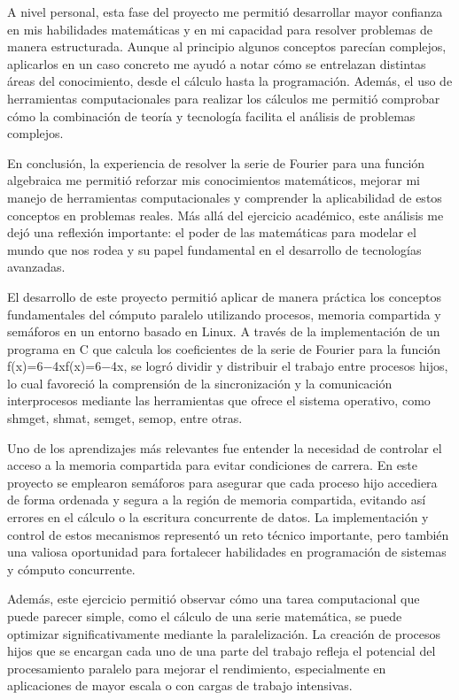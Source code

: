 {A nivel personal, esta fase del proyecto me permitió desarrollar mayor confianza en mis habilidades matemáticas y en mi capacidad para resolver problemas de manera estructurada. Aunque al principio algunos conceptos parecían complejos, aplicarlos en un caso concreto me ayudó a notar cómo se entrelazan distintas áreas del conocimiento, desde el cálculo hasta la programación. Además, el uso de herramientas computacionales para realizar los cálculos me permitió comprobar cómo la combinación de teoría y tecnología facilita el análisis de problemas complejos.

En conclusión, la experiencia de resolver la serie de Fourier para una función algebraica me permitió reforzar mis conocimientos matemáticos, mejorar mi manejo de herramientas computacionales y comprender la aplicabilidad de estos conceptos en problemas reales. Más allá del ejercicio académico, este análisis me dejó una reflexión importante: el poder de las matemáticas para modelar el mundo que nos rodea y su papel fundamental en el desarrollo de tecnologías avanzadas.

\newpage
El desarrollo de este proyecto permitió aplicar de manera práctica los conceptos fundamentales del cómputo paralelo utilizando procesos, memoria compartida y semáforos en un entorno basado en Linux. A través de la implementación de un programa en C que calcula los coeficientes de la serie de Fourier para la función f(x)=6−4xf(x)=6−4x, se logró dividir y distribuir el trabajo entre procesos hijos, lo cual favoreció la comprensión de la sincronización y la comunicación interprocesos mediante las herramientas que ofrece el sistema operativo, como shmget, shmat, semget, semop, entre otras.

Uno de los aprendizajes más relevantes fue entender la necesidad de controlar el acceso a la memoria compartida para evitar condiciones de carrera. En este proyecto se emplearon semáforos para asegurar que cada proceso hijo accediera de forma ordenada y segura a la región de memoria compartida, evitando así errores en el cálculo o la escritura concurrente de datos. La implementación y control de estos mecanismos representó un reto técnico importante, pero también una valiosa oportunidad para fortalecer habilidades en programación de sistemas y cómputo concurrente.

Además, este ejercicio permitió observar cómo una tarea computacional que puede parecer simple, como el cálculo de una serie matemática, se puede optimizar significativamente mediante la paralelización. La creación de procesos hijos que se encargan cada uno de una parte del trabajo refleja el potencial del procesamiento paralelo para mejorar el rendimiento, especialmente en aplicaciones de mayor escala o con cargas de trabajo intensivas.

}
